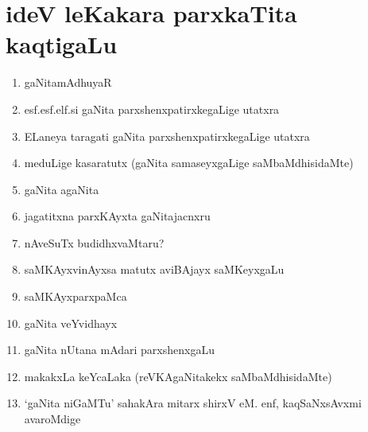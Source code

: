 \chapter{ideV leKakara parxkaTita kaqtigaLu}

\begin{enumerate}
\renewcommand{\labelenumi}{\rm(\theenumi)}
\item gaNitamAdhuyaR
  
\item esf.esf.elf.si gaNita parxshenxpatirxkegaLige utatxra

\item ELaneya taragati gaNita parxshenxpatirxkegaLige utatxra

\item meduLige kasaratutx (gaNita samaseyxgaLige saMbaMdhisidaMte)

\item gaNita agaNita

\item jagatitxna parxKAyxta gaNitajacnxru

\item nAveSuTx budidhxvaMtaru?

\item saMKAyxvinAyxsa matutx aviBAjayx saMKeyxgaLu 

\item saMKAyxparxpaMca

\item gaNita veYvidhayx

\item gaNita nUtana mAdari parxshenxgaLu

\item makakxLa keYcaLaka (reVKAgaNitakekx saMbaMdhisidaMte)

\item `gaNita niGaMTu' sahakAra mitarx shirxV eM. enf, kaqSaNxsAvxmi avaroMdige  
  
\end{enumerate}
